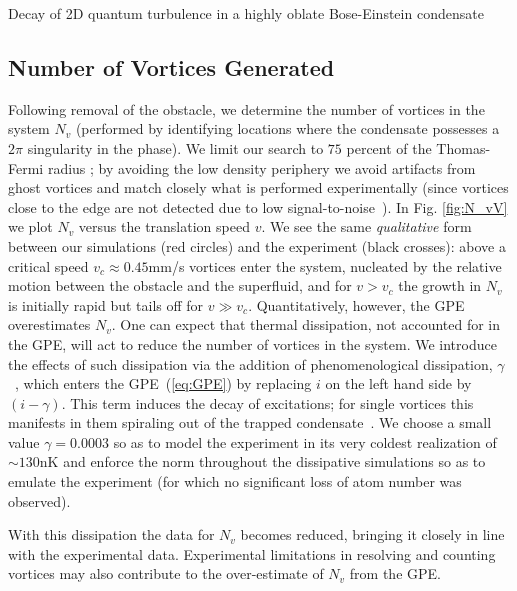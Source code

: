 \begin{chapter}{\label{cha:shin}Decay of 2D quantum turbulence in a highly oblate Bose-Einstein condensate}
\subsection{Number of Vortices Generated}
Following removal of the obstacle, we determine the number of vortices in the system $N_v$ (performed by identifying locations where the condensate possesses a $2\pi$ singularity in the phase).  
We limit our search to $75$ percent
 of the Thomas-Fermi radius ; by avoiding the low density periphery we avoid artifacts from ghost vortices and match closely what is performed experimentally (since vortices close to the edge are not detected due to low signal-to-noise~\citep{shin_private}).  In Fig. \ref{fig:N_vV} we plot $N_v$ versus the translation speed $v$.  We see the same {\it qualitative} form between our simulations (red circles) and the experiment (black crosses): above a critical speed $v_c \approx 0.45$mm/s vortices enter the system, nucleated by the relative motion between the obstacle and the superfluid, and for $v>v_c$ the growth in $N_v$ is initially rapid but tails off for $v\gg v_c$. Quantitatively, however, the GPE overestimates $N_v$.   One can expect that thermal dissipation, not accounted for in the GPE, will act to reduce the number of vortices in the system.  We introduce the effects of such dissipation via the addition of phenomenological dissipation, $\gamma$~\citep{choi_morgan_98,tsubota_kasamatsu_02}, which enters the GPE~(\ref{eq:GPE}) by replacing $i$ on the left hand side by $(i-\gamma)$.  This term induces the decay of excitations; for single vortices this manifests in them spiraling out of the trapped condensate~\citep{madarassy_barenghi_08,jackson_proukakis_09,allen_zaremba_13,yan_proukakis_14}.  
We choose a small value $\gamma = 0.0003$ so as to model the experiment in its very coldest realization of $\sim130$nK and enforce the norm throughout the dissipative simulations so as to emulate the experiment (for which no significant loss of atom number was observed).

 With this dissipation the data for $N_v$ becomes reduced, bringing it closely in line with the experimental data. Experimental limitations in resolving and counting vortices may also contribute to the over-estimate of $N_v$ from the GPE.


\end{chapter}
